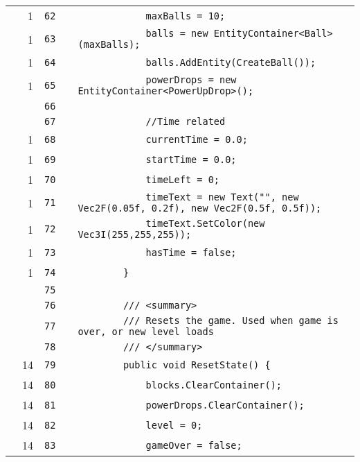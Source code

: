 \documentclass[a4paper,landscape,10pt]{article}
\begin{document}
\begin{longtable}[l]{lrrll}
\cellcolor{green} & 1 & \verb~62~ & & \verb~            maxBalls = 10;~\\
\cellcolor{green} & 1 & \verb~63~ & & \verb~            balls = new EntityContainer<Ball>(maxBalls);~\\
\cellcolor{green} & 1 & \verb~64~ & & \verb~            balls.AddEntity(CreateBall());~\\
\cellcolor{green} & 1 & \verb~65~ & & \verb~            powerDrops = new EntityContainer<PowerUpDrop>();~\\
\cellcolor{gray} &  & \verb~66~ & & \verb~~\\
\cellcolor{gray} &  & \verb~67~ & & \verb~            //Time related~\\
\cellcolor{green} & 1 & \verb~68~ & & \verb~            currentTime = 0.0;~\\
\cellcolor{green} & 1 & \verb~69~ & & \verb~            startTime = 0.0;~\\
\cellcolor{green} & 1 & \verb~70~ & & \verb~            timeLeft = 0;~\\
\cellcolor{green} & 1 & \verb~71~ & & \verb~            timeText = new Text("", new Vec2F(0.05f, 0.2f), new Vec2F(0.5f, 0.5f));~\\
\cellcolor{green} & 1 & \verb~72~ & & \verb~            timeText.SetColor(new Vec3I(255,255,255));~\\
\cellcolor{green} & 1 & \verb~73~ & & \verb~            hasTime = false;~\\
\cellcolor{green} & 1 & \verb~74~ & & \verb~        }~\\
\cellcolor{gray} &  & \verb~75~ & & \verb~~\\
\cellcolor{gray} &  & \verb~76~ & & \verb~        /// <summary>~\\
\cellcolor{gray} &  & \verb~77~ & & \verb~        /// Resets the game. Used when game is over, or new level loads~\\
\cellcolor{gray} &  & \verb~78~ & & \verb~        /// </summary>~\\
\cellcolor{green} & 14 & \verb~79~ & & \verb~        public void ResetState() {~\\
\cellcolor{green} & 14 & \verb~80~ & & \verb~            blocks.ClearContainer();~\\
\cellcolor{green} & 14 & \verb~81~ & & \verb~            powerDrops.ClearContainer();~\\
\cellcolor{green} & 14 & \verb~82~ & & \verb~            level = 0;~\\
\cellcolor{green} & 14 & \verb~83~ & & \verb~            gameOver = false;~\\

\end{longtable}
\end{document}
